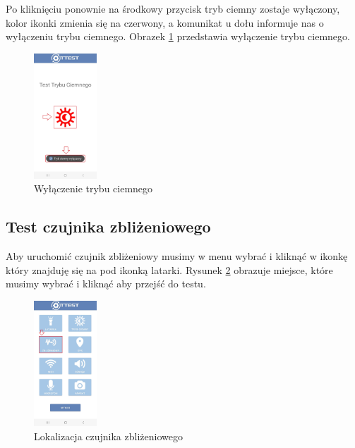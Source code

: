 \newpage


Po kliknięciu ponownie na środkowy przycisk tryb ciemny zostaje wyłączony, kolor ikonki zmienia się na czerwony, a komunikat u dołu informuje nas o wyłączeniu trybu ciemnego. 
\newline
Obrazek \ref{rys:tryb ciemny1} przedstawia wyłączenie trybu ciemnego. 

\begin{figure}[!hbt]
	\begin{center}
		\includegraphics[angle=360, width=0.21\textwidth]{rys/punkt6/tryb ciemny1.jpg}
		\caption{Wyłączenie trybu ciemnego}
		\label{rys:tryb ciemny1}
	\end{center}
\end{figure}


\subsection{Test czujnika zbliżeniowego}

Aby uruchomić czujnik zbliżeniowy musimy w menu wybrać i kliknąć w ikonkę który znajduję się na pod ikonką latarki. 
\newline
Rysunek \ref{rys:menu3} obrazuje miejsce, które musimy wybrać i kliknąć aby przejść do testu.

\begin{figure}[!hbt]
	\begin{center}
		\includegraphics[angle=360, width=0.21\textwidth]{rys/punkt6/menu3.jpg}
		\caption{Lokalizacja czujnika zbliżeniowego}
		\label{rys:menu3}
	\end{center}
\end{figure}

